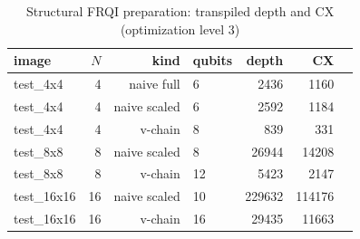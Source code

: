 
\begin{table}[htbp]
\centering
\caption{Structural FRQI preparation: transpiled depth and CX (optimization level 3)}
\label{tab:structural_resources}
\small
\begin{tabular}{lrrlrrr}
\toprule
image & $N$ & kind & qubits & depth & CX \\
\midrule
test\_4x4 & 4 & naive full & 6 & 2436 & 1160 \\
test\_4x4 & 4 & naive scaled & 6 & 2592 & 1184 \\
test\_4x4 & 4 & v-chain & 8 & 839 & 331 \\
test\_8x8 & 8 & naive scaled & 8 & 26944 & 14208 \\
test\_8x8 & 8 & v-chain & 12 & 5423 & 2147 \\
test\_16x16 & 16 & naive scaled & 10 & 229632 & 114176 \\
test\_16x16 & 16 & v-chain & 16 & 29435 & 11663 \\
\bottomrule
\end{tabular}
\end{table}
